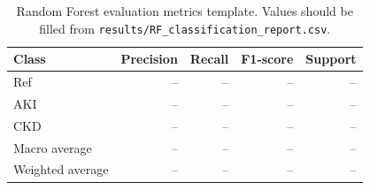 \begin{table}[H]
\centering
\caption{Random Forest evaluation metrics template. Values should be filled from \texttt{results/RF\_classification\_report.csv}.}
\label{tab:rf_metrics}
\begin{tabular}{lrrrr}
\toprule
Class & Precision & Recall & F1-score & Support \\
\midrule
Ref & -- & -- & -- & -- \\
AKI & -- & -- & -- & -- \\
CKD & -- & -- & -- & -- \\
Macro average & -- & -- & -- & -- \\
Weighted average & -- & -- & -- & -- \\
\bottomrule
\end{tabular}
\end{table}
